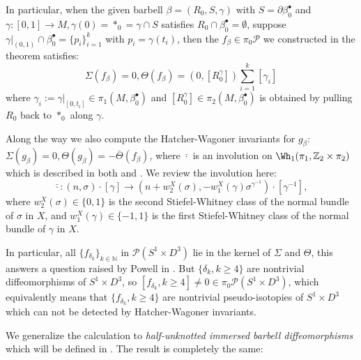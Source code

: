\begin{remark}
    In particular, when the given barbell $\beta=(R_0,S,\gamma)$ with $S=\partial\beta_0^\bullet$ and $\gamma:[0,1]\to M,\gamma(0)=*_0=\gamma\cap S$ satisfies $R_0\cap \beta_0^\bullet=\emptyset$, suppose $\gamma|_{(0,1)}\cap \beta_0^\bullet=\{p_i\}_{i=1}^k$ with $p_i=\gamma(t_i)$, then the $f_\beta\in \pi_0\mathcal{P}$ we constructed in the theorem satisfies:$$\Sigma(f_\beta)=0, \Theta(f_\beta)=(0,[R_0^\gamma])\sum_{i=1}^k [\gamma_i]$$where $\gamma_i:=\gamma|_{[0,t_i]}\in \pi_1(M,\beta_0^\bullet)$ and $[R_0^\gamma]\in \pi_2(M, \beta_0^\bullet)$ is obtained by pulling $R_0$ back to $*_0$ along $\gamma$.
\end{remark}

\begin{remark}
    Along the way we also compute the Hatcher-Wagoner invariants for $g_\beta$: $\Sigma(g_\beta)=0, \Theta(g_\beta)=-\bar{\Theta}(f_\beta)$, where $\bar{\cdot}$ is an involution on $\Wh_1(\pi_1, \mathbb{Z}_2\times \pi_2)$ which is described in both \cite{AST_1973__6__1_0} and \cite[section 9.1]{singh2022pseudoisotopiesdiffeomorphisms4manifolds}. We review the involution here:
    \[
      \bar{\cdot}: (n,\sigma)\cdot[\gamma]\to (n+w_2^X(\sigma), -w_1^X(\gamma)\sigma^{\gamma^{-1}})\cdot [\gamma^{-1}],
    \]
    where $w_2^X(\sigma)\in \{0,1\}$ is the second Stiefel-Whitney class of the normal bundle of $\sigma$ in $X$, and $w_1^X(\gamma)\in \{-1,1\}$ is the first Stiefel-Whitney class of the normal bundle of $\gamma$ in $X$.
\end{remark}

\begin{remark}
    In particular, all $\{f_{\delta_k}\}_{k\in \mathbb{N}}$ in $\mathcal{P}(S^1\times D^3)$ lie in the kernel of $\Sigma$ and $\Theta$, this answers a question raised by Powell in \cite[Question 12.6]{powellmapping}. But $\{\delta_k, k\geq 4\}$ are nontrivial diffeomorphisms of $S^1\times D^3$, so $[f_{\delta_k}, k\geq 4]\neq 0\in \pi_0\mathcal{P}(S^1\times D^3)$, which equivalently means that $\{f_{\delta_k},k\geq 4\}$ are nontrivial pseudo-isotopies of $S^1\times D^3$ which can not be detected by Hatcher-Wagoner invariants.
\end{remark}

We generalize the calculation to \emph{half-unknotted immersed barbell diffeomorphisms} which will be defined in . The result is completely the same:

